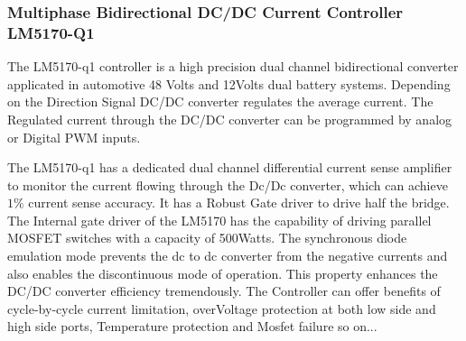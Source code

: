 \subsubsection{Multiphase Bidirectional DC/DC Current Controller LM5170-Q1}
\indent The LM5170-q1 controller is a high precision dual channel bidirectional converter applicated in automotive 48 Volts and 12Volts dual battery systems. Depending on the Direction Signal DC/DC converter regulates the average current. The Regulated current through the DC/DC converter can be programmed by analog or Digital PWM inputs.

The LM5170-q1 has a dedicated dual channel differential current sense amplifier to monitor the current flowing through the Dc/Dc converter, which can achieve $1\%$ current sense accuracy. It has a Robust Gate driver to drive half the bridge. The Internal gate driver of the LM5170 has the capability of driving parallel MOSFET switches with a capacity of 500Watts. The synchronous diode emulation mode prevents the dc to dc converter from the negative currents and also enables the discontinuous mode of operation. This property enhances the DC/DC converter efficiency tremendously. The Controller can offer benefits of cycle-by-cycle current limitation, overVoltage protection at both low side and high side ports, Temperature protection and Mosfet failure so on...